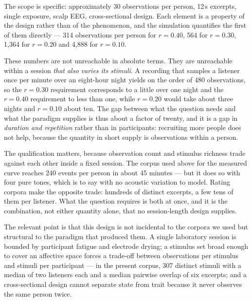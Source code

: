 The scope is specific: approximately 30 observations per person, 12\,s excerpts,
single exposure, scalp EEG, cross-sectional design. Each element is a property of
the design rather than of the phenomenon, and the simulation quantifies the first
of them directly --- 314 observations per person for $r = 0.40$, 564 for
$r = 0.30$, 1,364 for $r = 0.20$ and 4,888 for $r = 0.10$.

These numbers are not unreachable in absolute terms. They are unreachable within a
session \emph{that also varies its stimuli}. A recording that samples a listener
once per minute over an eight-hour night yields on the order of 480 observations,
so the $r = 0.30$ requirement corresponds to a little over one night and the
$r = 0.40$ requirement to less than one, while $r = 0.20$ would take about three
nights and $r = 0.10$ about ten. The gap between what the question
needs and what the paradigm supplies is thus about a factor of twenty, and it is a
gap in \emph{duration and repetition} rather than in participants: recruiting more
people does not help, because the quantity in short supply is observations within
a person.

The qualification matters, because observation count and stimulus richness trade
against each other inside a fixed session. The corpus used above for the measured
curve reaches 240 events per person in about 45 minutes --- but it does so with
four pure tones, which is to say with no acoustic variation to model. Rating
corpora make the opposite trade: hundreds of distinct excerpts, a few tens of them
per listener. What the question requires is both at once, and it is the
combination, not either quantity alone, that no session-length design supplies.

The relevant point is that this design is not incidental to the corpora we used but
structural to the paradigm that produced them. A single laboratory session is
bounded by participant fatigue and electrode drying; a stimulus set broad enough to
cover an affective space forces a trade-off between observations per stimulus and
stimuli per participant --- in the present corpus, 307 distinct stimuli with a
median of two listeners each and a median pairwise overlap of six excerpts; and a
cross-sectional design cannot separate state from trait because it never observes
the same person twice.

